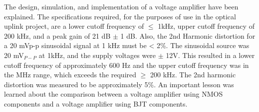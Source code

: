 
	The design, simulation, and implementation of a voltage amplifier have been explained. The specifications required, for the purposes of use in the optical uplink project, are a lower cutoff frequency of $\le$ 1kHz, upper cutoff frequency of 200 kHz, and a peak gain of 21 dB $\pm$ 1 dB. Also, the 2nd Harmonic distortion for a 20 mVp-p sinusoidal signal at 1 kHz must be < 2\%. The sinusoidal source was 20 mV$_{P-P}$ at 1kHz, and the supply voltages were $\pm$ 12V. This resulted in a lower cutoff frequency of approximately 600 Hz and the upper cutoff frequency was in the MHz range, which exceeds the required $\ge$ 200 kHz. The 2nd harmonic distortion was measured to be approximately 5\%. An important lesson was learned about the comparison between a voltage amplifier using NMOS components and a voltage amplifier using BJT components.


